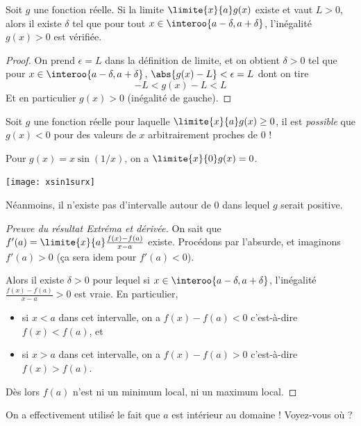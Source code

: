 \begin{frame}%
  \begin{lemma}\label{limitestricte-fonctionstricte}Soit \(g\) une fonction réelle. Si la limite \(\limite{x}{a} g(x)\) existe et vaut \(L > 0\)\pause, alors il existe \(\delta\) tel que pour tout \(x \in \interoo{a-\delta,a+\delta}\), l'inégalité \(g(x) > 0\) est vérifiée.
  \end{lemma}
  \begin{proof}\pause
    On prend \(\epsilon = L\) dans la définition de limite, et on obtient \(\delta > 0\) tel que pour \(x \in \interoo{a-\delta,a+\delta}\), \(\abs{g(x) - L} < \epsilon = L \)\pause{} dont on tire
    \begin{equation*}
      -L < g(x) - L < L
    \end{equation*}\pause
    Et en particulier \(g(x) > 0\) (inégalité de gauche).
  \end{proof}
\end{frame}
\begin{frame}%
  \begin{remark*}
    Soit \(g\) une fonction réelle pour laquelle \(\limite{x}{a} g(x) \geq 0\), il est \emph{possible} que \(g(x) < 0\) pour des valeurs de \(x\) arbitrairement proches de \(0\) !
  \end{remark*}
  \begin{example}
    Pour \(g(x) = x \sin(1/x)\)\pause, on a \(\limite{x}{0} g(x) = 0\).\pause
    \begin{center}
      \texttt{[image: xsin1surx]}
    \end{center}\pause
    Néanmoins, il n'existe pas d'intervalle autour de \(0\) dans lequel \(g\) serait positive.
  \end{example}
\end{frame}
\begin{frame}
  \begin{proof}[Preuve du résultat \og Extréma et dérivée\fg{}]
    On sait que \(f'(a) = \limite{x}{a} \frac{f(x)-f(a)}{x-a}\) existe.\pause{} Procédons par l'absurde, et imaginons \(f'(a) > 0\)\pause{} (ça sera idem pour \(f'(a)< 0\)).\pause{}

    Alors il existe \(\delta > 0\) pour lequel si \(x \in \interoo{a-\delta, a+\delta}\), l'inégalité \(\frac{f(x)-f(a)}{x-a} > 0\) est vraie.\pause{} En particulier,
    \begin{itemize}[<+->]
    \item si \(x < a\) dans cet intervalle, on a \(f(x) - f(a) < 0\) c'est-à-dire \(f(x) < f(a)\), et
    \item si \(x > a\) dans cet intervalle, on a \(f(x) - f(a) > 0\) c'est-à-dire \(f(x) > f(a)\).
    \end{itemize}\pause
    Dès lors \(f(a)\) n'est ni un minimum local, ni un maximum local.
  \end{proof}\pause
  \begin{remark*}
    On a effectivement utilisé le fait que \(a\) est intérieur au domaine ! Voyez-vous où ?
  \end{remark*}
\end{frame}
